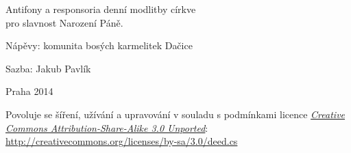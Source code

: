 \documentclass[a5paper, twoside, 12pt]{article}
\begin{document}




\pagebreak
{}








\mbox{}
\vfill

\pagestyle{empty}

\setlength{\parindent}{0pt}

Antifony a responsoria denní modlitby církve\\ 
pro slavnost Narození Páně.

Nápěvy: komunita bosých karmelitek Dačice

Sazba: Jakub Pavlík

Praha 2014

\vspace{5mm}

Povoluje se šíření, užívání a upravování v souladu s podmínkami
licence \href{http://creativecommons.org/licenses/by-sa/3.0/deed.cs}{\emph{Creative Commons At\-tri\-bu\-tion-\-Sha\-re-A\-li\-ke 3.0 Unported}}:
\href{http://creativecommons.org/licenses/by-sa/3.0/deed.cs}{http://creativecommons.org/licenses/by-sa/3.0/deed.cs}
\end{document}
